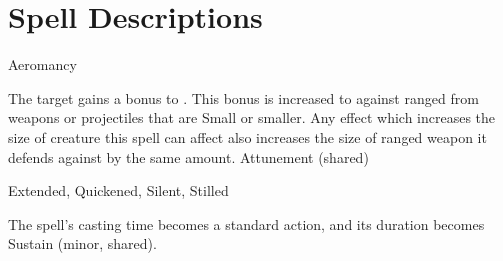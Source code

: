 \section{Spell Descriptions}
\begin{spellsection}{Aeromancy}
\begin{spellheader}
\end{spellheader}
\begin{spellcontent}
\begin{spelltargetinginfo}
\end{spelltargetinginfo}
\begin{spelleffects}
\spelleffect
The target gains a  bonus to .
This bonus is increased to  against ranged  from weapons or projectiles that are Small or smaller.
Any effect which increases the size of creature this spell can affect also increases the size of ranged weapon it defends against by the same amount.
\spelldur Attunement (shared)
\end{spelleffects}
\end{spellcontent}
\begin{spellfooter}
 Extended, Quickened, Silent, Stilled
\end{spellfooter}
\begin{spellsubcontent}
\begin{spellcantrip}
The spell's casting time becomes a standard action, and its duration becomes Sustain (minor, shared).
\end{spellcantrip}
\end{spellsubcontent}
\end{spellsection}
